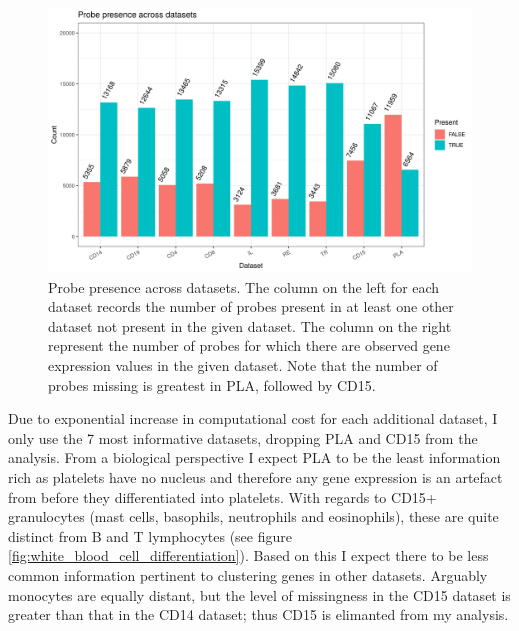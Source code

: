 \documentclass[14pt]{extarticle} %
\begin{document}
	\begin{figure}
		\centering
		\includegraphics[scale=0.9 ]{Images/Data_inspection/probe_presence_across_datasets_no_all.png}
		\caption{Probe presence across datasets. The column on the left for each dataset records the number of probes present in at least one other dataset not present in the given dataset. The column on the right represent the number of probes for which there are observed gene expression values  in the given dataset. Note that the number of probes missing is greatest in PLA, followed by CD15.}
		\label{fig:probe_presence_across_datasets}
	\end{figure}
	
	
	Due to exponential increase in computational cost for each additional dataset, I only use the 7 most informative datasets, dropping PLA and CD15 from the analysis. From a biological perspective I expect PLA to be the least information rich as platelets have no nucleus \citep{Wrighthistogenesisbloodplatelets1910} and therefore any gene expression is an artefact from before they differentiated into platelets. With regards to CD15+ granulocytes (mast cells, basophils, neutrophils and eosinophils), these are quite distinct from B and T lymphocytes (see figure \ref{fig:white_blood_cell_differentiation}). Based on this I expect there to be less common information pertinent to clustering genes in other datasets. Arguably monocytes are equally distant, but the level of missingness in the CD15 dataset is greater than that in the CD14 dataset; thus CD15 is elimanted from my analysis.
\end{document}
